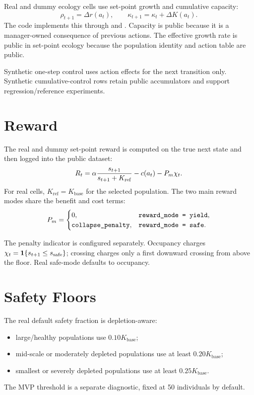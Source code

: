 \documentclass[11pt]{article}
\begin{document}
Real and dummy ecology cells use set-point growth and cumulative capacity:
\[
  \rho_{t+1} = \Delta r(a_t),\qquad
  \kappa_{t+1} = \kappa_t + \Delta K(a_t).
\]
The code implements this through  and
. Capacity is public because it is a manager-owned
consequence of previous actions. The effective growth rate is public in
set-point ecology because the population identity and action table are public.

Synthetic one-step control uses action effects for the next transition only.
Synthetic cumulative-control rows retain public accumulators and support
regression/reference experiments.

\section{Reward}

The real and dummy set-point reward is computed on the true next state and then
logged into the public dataset:
\[
  R_t =
  \alpha\frac{s_{t+1}}{s_{t+1}+K_{\mathrm{ref}}}
  - c(a_t)
  - P_m\chi_t.
\]
For real cells, $K_{\mathrm{ref}}=K_{\mathrm{base}}$ for the selected population.
The two main reward modes share the benefit and cost terms:
\[
  P_m =
  \begin{cases}
    0, & \code{reward_mode = yield},\\
    \code{collapse_penalty}, & \code{reward_mode = safe}.
  \end{cases}
\]

The penalty indicator is configured separately. Occupancy charges
$\chi_t=\mathbf{1}\{s_{t+1} \le s_{\mathrm{safe}}\}$; crossing charges only a first downward crossing
from above the floor. Real safe-mode defaults to occupancy.

\section{Safety Floors}

The real default safety fraction is depletion-aware:
\begin{itemize}
  \item large/healthy populations use $0.10K_{\mathrm{base}}$;
  \item mid-scale or moderately depleted populations use at least
    $0.20K_{\mathrm{base}}$;
  \item smallest or severely depleted populations use at least
    $0.25K_{\mathrm{base}}$.
\end{itemize}
The MVP threshold is a separate diagnostic, fixed at 50 individuals by default.
\end{document}
